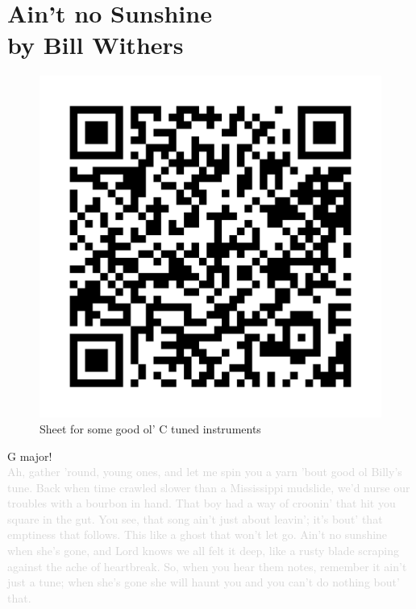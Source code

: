 \chapter[Ain't no Sunshine]{Ain't no Sunshine\\[1ex]\large{by Bill Withers}}

\begin{figure}
\includegraphics[width=1\linewidth]{QR_Codes/QR_AintNoSunshine_C.png}\\
Sheet for some good ol' C tuned instruments
\end{figure}

G major! \\
\textcolor{lightgray}{Ah, gather 'round, young ones, and let me spin you a yarn 'bout good ol Billy's tune. Back when time crawled slower than a Mississippi mudslide, we'd nurse our troubles with a bourbon in hand. That boy had a way of croonin' that hit you square in the gut. You see, that song ain't just about leavin'; it's bout' that emptiness that follows. This like a ghost that won't let go. Ain't no sunshine when she's gone, and Lord knows we all felt it deep, like a rusty blade scraping against the ache of heartbreak. So, when you hear them notes, remember it ain't just a tune; when she's gone she will haunt you and you can't do nothing bout' that.}\\

